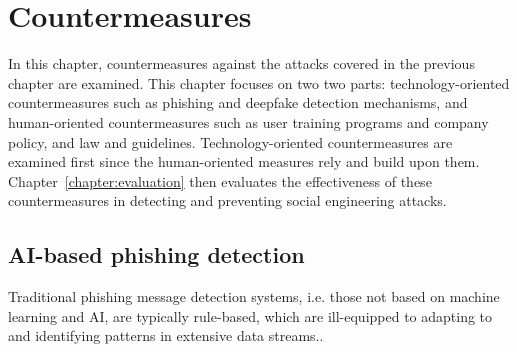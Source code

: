 


\chapter{Countermeasures\label{chapter:countermeasures}}

\begin{comment}

TODO:
    [ ] 

What to cover:
    - AI monitoring content and informing the user if something they are about to share could be used against them or their organization?
    - AI generated training content suited to the personality of the user
    - Policies and EU etc regulations about the development of AI tech

\end{comment}

In this chapter, countermeasures against the attacks covered in the previous chapter are examined. This chapter focuses on two two parts: technology-oriented countermeasures such as phishing and deepfake detection mechanisms, and human-oriented countermeasures such as user training programs and company policy, and law and guidelines. Technology-oriented countermeasures are examined first since the human-oriented measures rely and build upon them. Chapter~\ref{chapter:evaluation} then evaluates the effectiveness of these countermeasures in detecting and preventing social engineering attacks.












\section{AI-based phishing detection}
\begin{comment}

AI-generated content detection

What to cover:
    - Deepfake content detection
    - Spear phishing detection

    
\end{comment}



Traditional phishing message detection systems, i.e. those not based on machine learning and AI, are typically rule-based, which are ill-equipped to adapting to and identifying patterns in extensive data streams.\citep{fakhouri_AI_Driven_Solutions_SE_Attacks_2024}.

